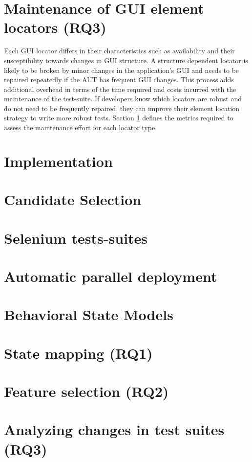 


\section{Maintenance of GUI element locators (RQ3)}
\label{locatorMaintenance}

Each GUI locator differs in their characteristics such as availability and their susceptibility towards changes in GUI structure. A structure dependent locator is likely to be broken by minor changes in the application's GUI and needs to be repaired repeatedly if the AUT has frequent GUI changes. This process adds additional overhead in terms of the time required and costs incurred with the maintenance of the test-suite. If developers know which locators are robust and do not need to be frequently repaired, they can improve their element location strategy to write more robust tests. Section \ref{locatorMaintenance} defines the metrics required to assess the maintenance effort for each locator type. 

\section{Implementation}
\label{Implement}
\section{Candidate Selection}
\section{Selenium tests-suites}
\section{Automatic parallel deployment}
\section{Behavioral State Models}
\section{State mapping (RQ1)}
\section{Feature selection (RQ2)}
\section{Analyzing changes in test suites (RQ3)}
